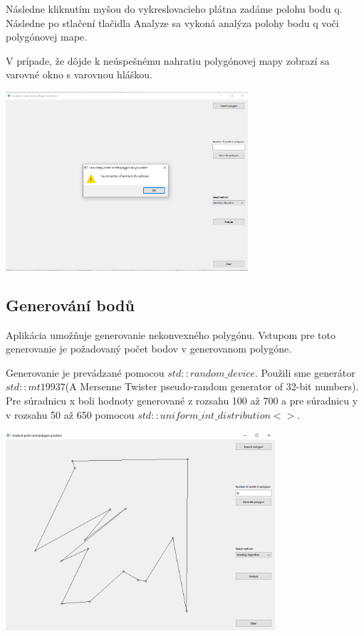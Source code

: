 \documentclass[12pt]{article}
\begin{document}
Následne kliknutím myšou do vykreslovacieho plátna zadáme polohu bodu q. Následne po stlačení tlačidla Analyze sa vykoná analýza polohy bodu q voči polygónovej mape.  

V prípade, že dôjde k neúspešnému nahratiu polygónovej mapy zobrazí sa varovné okno s varovnou hláškou.

\begin{center}
   \includegraphics[width=9cm]{./img/warning.png}
\end{center}

\subsection{Generování bodů}
Aplikácia umožňuje generovanie nekonvexného polygónu. Vstupom pre toto generovanie je požadovaný počet bodov v generovanom polygóne.

Generovanie je prevádzané pomocou $std::random\_device$. Použili sme generátor $std::mt19937$(A Mersenne Twister pseudo-random generator of 32-bit numbers). Pre súradnicu x boli hodnoty generované z rozsahu 100 až 700 a pre súradnicu y v  rozsahu 50 až 650 pomocou $std::uniform\_int\_distribution<>$.

\begin{center}
   \includegraphics[width=10cm]{./img/generate.png}
\end{center}
\end{document}
